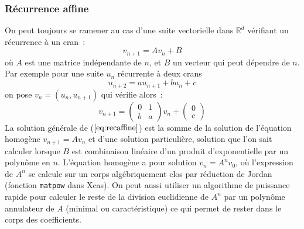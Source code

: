 \documentclass[a4paper,11pt]{article}
\begin{document}
\begin{giacjshere}
\subsubsection{Récurrence affine}
On peut toujours se ramener au cas d'une suite vectorielle dans $\mathbb{R}^d$
vérifiant un récurrence à un cran~:
\begin{equation} v_{n+1} = A v_n + B \label{eq:recaffine}
\end{equation}
où $A$ est une matrice indépendante de $n$, et $B$ un vecteur qui peut
dépendre de $n$.
Par exemple pour une suite $u_n$ récurrente à deux crans
\[ u_{n+2}=au_{n+1}+bu_n+c\]
on pose $v_n=(u_n,u_{n+1})$ qui vérifie alors~:
\[ v_{n+1}= \left( \begin{array}{cc} 0 & 1 \\ b & a \end{array}\right) v_n + 
\left( \begin{array}{c}0 \\ c\end{array}\right)\] 
La solution générale de (\(\ref{eq:recaffine}\)) est la somme de la solution
de l'équation homogène $v_{n+1}=Av_n$ et d'une solution particulière,
solution que l'on sait calculer lorsque $B$ est combinaison linéaire
d'un produit d'exponentielle par un polynôme en $n$.
L'équation homogène a pour solution $v_n=A^n v_0$, où l'expression de $A^n$
se calcule sur un corps algébriquement clos par réduction de Jordan
(fonction \verb|matpow| dans Xcas). On peut aussi utiliser un algorithme
de puissance rapide pour calculer le reste de la division euclidienne
de $A^n$ par un polynôme annulateur de $A$ (minimal ou caractéristique)
ce qui permet de rester dans le corps des coefficients.


\end{giacjshere}
\end{document}
